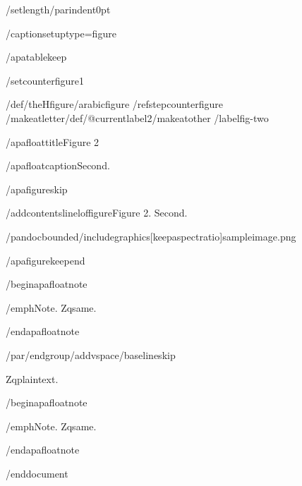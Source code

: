 /setlength{/parindent}{0pt}

/captionsetup{type=figure}

/apatablekeep

/setcounter{figure}{1}

/def/theHfigure{/arabic{figure}}%
/refstepcounter{figure}%
/makeatletter/def/@currentlabel{2}/makeatother%
/label{fig-two}

/apafloattitle{Figure 2}

/apafloatcaption{Second.}

/apafigureskip

/addcontentsline{lof}{figure}{Figure 2. Second.}

/pandocbounded{/includegraphics[keepaspectratio]{sampleimage.png}}

/apafigurekeepend

/begin{apafloatnote}

/emph{Note}. Zqsame.

/end{apafloatnote}

/par/endgroup/addvspace{/baselineskip}

Zqplaintext.

/begin{apafloatnote}

/emph{Note}. Zqsame.

/end{apafloatnote}




/end{document}
